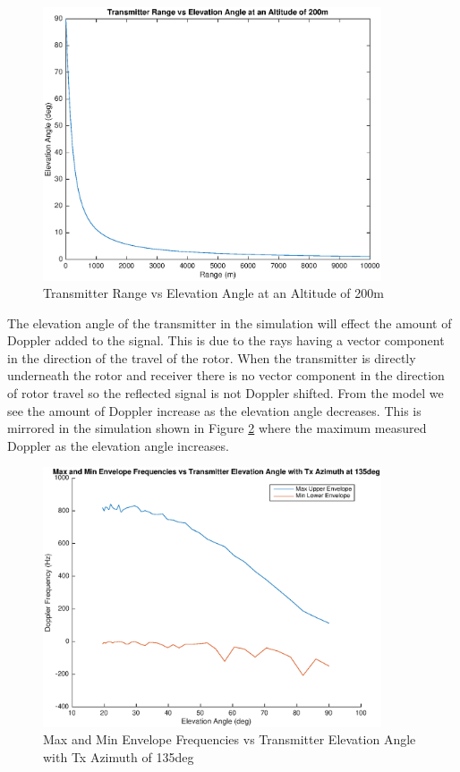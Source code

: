  \begin{figure}
	\begin{center}
		\includegraphics[width=10cm]{images/simulation/range_elevation_rel.eps}
		\caption{Transmitter Range vs Elevation Angle at an Altitude of 200m}
		\label{fig:tx_range_elevation_rel}
	\end{center}
\end{figure}

The elevation angle of the transmitter in the simulation will effect the amount of Doppler added to the signal. This is due to the rays having a vector component in the direction of the travel of the rotor. When the transmitter is directly underneath the rotor and receiver there is no vector component in the direction of rotor travel so the reflected signal is not Doppler shifted. From the model we see the amount of Doppler increase as the elevation angle decreases. This is mirrored in the simulation shown in Figure \ref{fig:tx_elevation_135deg} where the maximum measured Doppler as the elevation angle increases.

 \begin{figure}
	\begin{center}
		\includegraphics[width=10cm]{images/simulation/elevation_angle_max_doppler_135deg.eps}
		\caption{Max and Min Envelope Frequencies vs Transmitter Elevation Angle with Tx Azimuth of 135deg}
		\label{fig:tx_elevation_135deg}
	\end{center}
\end{figure}

